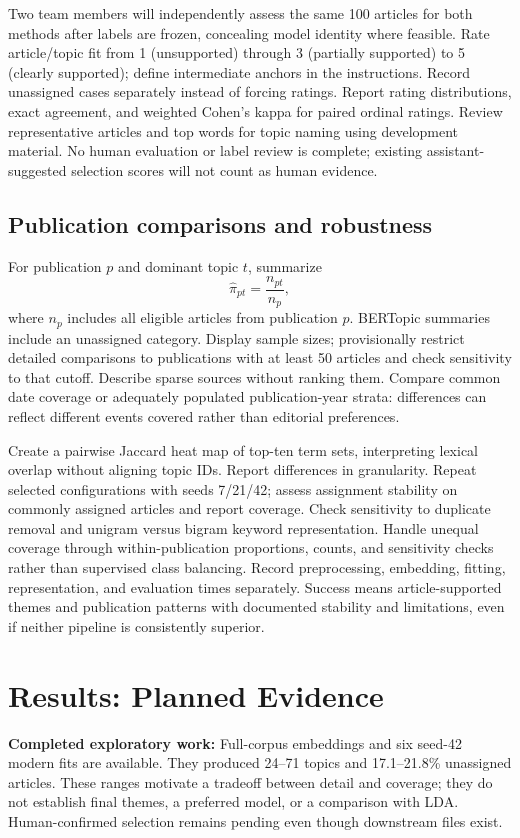 \documentclass[conference]{IEEEtran}
\begin{document}
Two team members will independently assess the same 100 articles for both methods after labels are frozen, concealing model identity where feasible. Rate article/topic fit from 1 (unsupported) through 3 (partially supported) to 5 (clearly supported); define intermediate anchors in the instructions. Record unassigned cases separately instead of forcing ratings. Report rating distributions, exact agreement, and weighted Cohen's kappa for paired ordinal ratings. Review representative articles and top words for topic naming using development material. No human evaluation or label review is complete; existing assistant-suggested selection scores will not count as human evidence.

\subsection{Publication comparisons and robustness}
For publication $p$ and dominant topic $t$, summarize
\begin{equation}
\widehat{\pi}_{pt}=\frac{n_{pt}}{n_p},
\label{eq:proportion}
\end{equation}
where $n_p$ includes all eligible articles from publication $p$. BERTopic summaries include an unassigned category. Display sample sizes; provisionally restrict detailed comparisons to publications with at least 50 articles and check sensitivity to that cutoff. Describe sparse sources without ranking them. Compare common date coverage or adequately populated publication-year strata: differences can reflect different events covered rather than editorial preferences.

Create a pairwise Jaccard heat map of top-ten term sets, interpreting lexical overlap without aligning topic IDs. Report differences in granularity. Repeat selected configurations with seeds 7/21/42; assess assignment stability on commonly assigned articles and report coverage. Check sensitivity to duplicate removal and unigram versus bigram keyword representation. Handle unequal coverage through within-publication proportions, counts, and sensitivity checks rather than supervised class balancing. Record preprocessing, embedding, fitting, representation, and evaluation times separately. Success means article-supported themes and publication patterns with documented stability and limitations, even if neither pipeline is consistently superior.

\section{Results: Planned Evidence}
\textbf{Completed exploratory work:} Full-corpus embeddings and six seed-42 modern fits are available. They produced 24--71 topics and 17.1--21.8\% unassigned articles. These ranges motivate a tradeoff between detail and coverage; they do not establish final themes, a preferred model, or a comparison with LDA. Human-confirmed selection remains pending even though downstream files exist.
\end{document}
